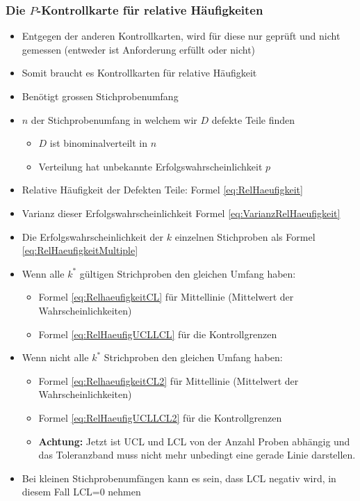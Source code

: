 \subsubsection{Die $P$-Kontrollkarte für relative Häufigkeiten}
\begin{itemize}
	\item Entgegen der anderen Kontrollkarten, wird für diese nur geprüft und nicht gemessen (entweder ist Anforderung erfüllt oder nicht)
	\item Somit braucht es Kontrollkarten für relative Häufigkeit 
	\item Benötigt grossen Stichprobenumfang
	\item $n$ der Stichprobenumfang in welchem wir $D$ defekte Teile finden
	\begin{itemize}
		\item $D$ ist binominalverteilt in $n$
		\item Verteilung hat unbekannte Erfolgswahrscheinlichkeit $p$
	\end{itemize}
	\item Relative Häufigkeit der Defekten Teile: Formel \ref{eq:RelHaeufigkeit}
	\item Varianz dieser Erfolgswahrscheinlichkeit Formel \ref{eq:VarianzRelHaeufigkeit}
	\item Die Erfolgswahrscheinlichkeit der $k$ einzelnen Stichproben als Formel \ref{eq:RelHaeufigkeitMultiple}
	\item Wenn alle $k^\ast$ gültigen Strichproben den gleichen Umfang haben:
	\begin{itemize}
		\item Formel \ref{eq:RelhaeufigkeitCL} für Mittellinie (Mittelwert der Wahrscheinlichkeiten)
		\item Formel \ref{eq:RelHaeufigUCLLCL} für die Kontrollgrenzen
	\end{itemize} 
	\item Wenn nicht alle $k^\ast$ Strichproben den gleichen Umfang haben:
	\begin{itemize}
		\item Formel \ref{eq:RelhaeufigkeitCL2} für Mittellinie (Mittelwert der Wahrscheinlichkeiten)
		\item Formel \ref{eq:RelHaeufigUCLLCL2} für die Kontrollgrenzen
		\item \textbf{Achtung:} Jetzt ist UCL und LCL von der Anzahl Proben abhängig und das Toleranzband muss nicht mehr unbedingt eine gerade Linie darstellen.
	\end{itemize} 
	\item Bei kleinen Stichprobenumfängen kann es sein, dass LCL negativ wird, in diesem Fall LCL=0 nehmen

\end{itemize}
